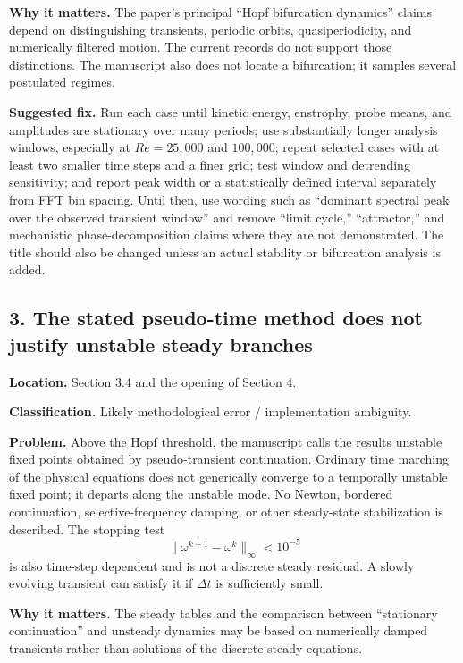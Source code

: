 \documentclass[11pt]{article}
\newcommand{\Rey}{\mathit{Re}}
\begin{document}
\textbf{Why it matters.} The paper's principal ``Hopf bifurcation dynamics'' claims depend on distinguishing transients, periodic orbits, quasiperiodicity, and numerically filtered motion. The current records do not support those distinctions. The manuscript also does not locate a bifurcation; it samples several postulated regimes.

\textbf{Suggested fix.} Run each case until kinetic energy, enstrophy, probe means, and amplitudes are stationary over many periods; use substantially longer analysis windows, especially at $\Rey=25{,}000$ and $100{,}000$; repeat selected cases with at least two smaller time steps and a finer grid; test window and detrending sensitivity; and report peak width or a statistically defined interval separately from FFT bin spacing. Until then, use wording such as ``dominant spectral peak over the observed transient window'' and remove ``limit cycle,'' ``attractor,'' and mechanistic phase-decomposition claims where they are not demonstrated. The title should also be changed unless an actual stability or bifurcation analysis is added.

\subsection*{3. The stated pseudo-time method does not justify unstable steady branches}

\textbf{Location.} Section 3.4 and the opening of Section 4.

\textbf{Classification.} Likely methodological error / implementation ambiguity.

\textbf{Problem.} Above the Hopf threshold, the manuscript calls the results unstable fixed points obtained by pseudo-transient continuation. Ordinary time marching of the physical equations does not generically converge to a temporally unstable fixed point; it departs along the unstable mode. No Newton, bordered continuation, selective-frequency damping, or other steady-state stabilization is described. The stopping test
\[
\lVert\omega^{k+1}-\omega^k\rVert_\infty<10^{-5}
\]
is also time-step dependent and is not a discrete steady residual. A slowly evolving transient can satisfy it if $\Delta t$ is sufficiently small.

\textbf{Why it matters.} The steady tables and the comparison between ``stationary continuation'' and unsteady dynamics may be based on numerically damped transients rather than solutions of the discrete steady equations.
\end{document}
